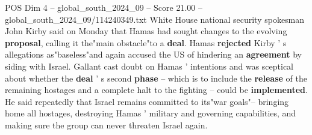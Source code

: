 \begin{textsample}{POS Dim 4 – global\_south\_2024\_09 – Score 21.00 – global\_south\_2024\_09/114240349.txt}
White House national security spokesman John Kirby said on Monday that Hamas had sought changes to the evolving \textbf{proposal}, calling it the"main obstacle"to a \textbf{deal}.
Hamas \textbf{rejected} Kirby ' s allegations as"baseless"and again accused the US of hindering an \textbf{agreement} by siding with Israel.
Gallant cast doubt on Hamas ' intentions and was sceptical about whether the \textbf{deal} ' s second \textbf{phase} -- which is to include the \textbf{release} of the remaining hostages and a complete halt to the fighting -- could be \textbf{implemented}.
He said repeatedly that Israel remains committed to its"war goals"-- bringing home all hostages, destroying Hamas ' military and governing capabilities, and making sure the group can never threaten Israel again.

\end{textsample}
